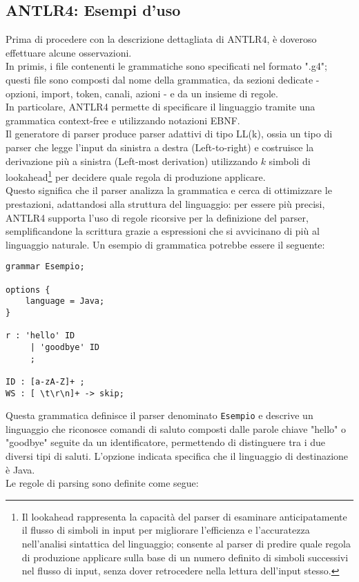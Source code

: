 \documentclass{article}
\begin{document}
\subsection{ANTLR4: Esempi d'uso}
Prima di procedere con la descrizione dettagliata di ANTLR4, è doveroso effettuare alcune osservazioni. \\In primis, i file contenenti le grammatiche sono specificati nel formato ".g4"; questi file sono composti dal nome della grammatica, da sezioni dedicate - opzioni, import, token, canali, azioni - e da un insieme di regole.\\In particolare, ANTLR4 permette di specificare il linguaggio tramite una grammatica context-free e utilizzando notazioni EBNF.
\\\noindent
Il generatore di parser produce parser adattivi di tipo LL(k), ossia un tipo di parser che legge l’input da sinistra a destra (Left-to-right) e costruisce la derivazione più a sinistra (Left-most derivation) utilizzando \( k \) simboli di lookahead\footnote{Il lookahead rappresenta la capacità del parser di esaminare anticipatamente il flusso di simboli in input per migliorare l'efficienza e l'accuratezza nell'analisi sintattica del linguaggio; consente al parser di predire quale regola di produzione applicare sulla base di un numero definito di simboli successivi nel flusso di input, senza dover retrocedere nella lettura dell'input stesso.} per decidere quale regola di produzione applicare.
\\\noindent
Questo significa che il parser analizza la grammatica e cerca di ottimizzare le prestazioni, adattandosi alla struttura del linguaggio: per essere più precisi, ANTLR4 supporta l'uso di regole ricorsive per la definizione del parser, semplificandone la scrittura grazie a espressioni che si avvicinano di più al linguaggio naturale. Un esempio di grammatica potrebbe essere il seguente:
\begin{lstlisting} 
grammar Esempio;

options {
    language = Java;
}

r : 'hello' ID
     | 'goodbye' ID
     ;

ID : [a-zA-Z]+ ;
WS : [ \t\r\n]+ -> skip;  
\end{lstlisting}
\noindent
Questa grammatica definisce il parser denominato \texttt{Esempio} e descrive un linguaggio che riconosce comandi di saluto composti dalle parole chiave "hello" o "goodbye" seguite da un identificatore, permettendo di distinguere tra i due diversi tipi di saluti. L'opzione indicata specifica che il linguaggio di destinazione è Java.\\\noindent Le regole di parsing sono definite come segue:
\end{document}
